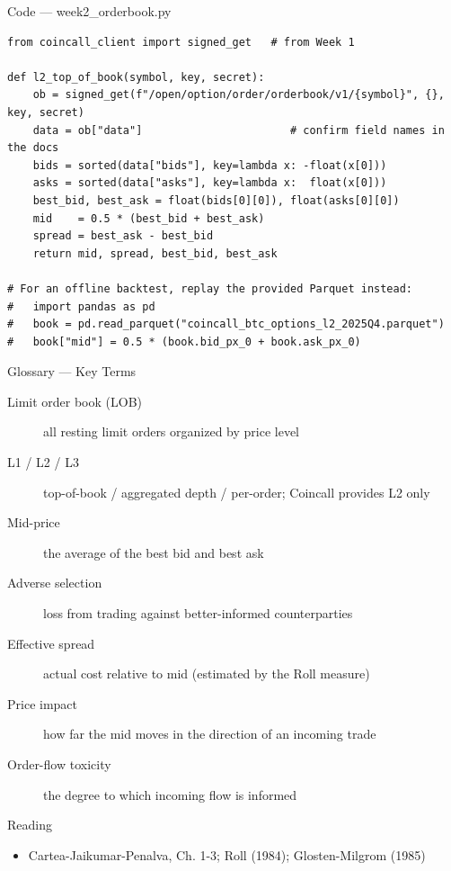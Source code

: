 \documentclass[aspectratio=169,10pt]{beamer}
\begin{document}
\begin{frame}[fragile]{Code --- week2\_orderbook.py}
\begin{lstlisting}
from coincall_client import signed_get   # from Week 1

def l2_top_of_book(symbol, key, secret):
    ob = signed_get(f"/open/option/order/orderbook/v1/{symbol}", {}, key, secret)
    data = ob["data"]                       # confirm field names in the docs
    bids = sorted(data["bids"], key=lambda x: -float(x[0]))
    asks = sorted(data["asks"], key=lambda x:  float(x[0]))
    best_bid, best_ask = float(bids[0][0]), float(asks[0][0])
    mid    = 0.5 * (best_bid + best_ask)
    spread = best_ask - best_bid
    return mid, spread, best_bid, best_ask

# For an offline backtest, replay the provided Parquet instead:
#   import pandas as pd
#   book = pd.read_parquet("coincall_btc_options_l2_2025Q4.parquet")
#   book["mid"] = 0.5 * (book.bid_px_0 + book.ask_px_0)
\end{lstlisting}
\end{frame}
\begin{frame}{Glossary --- Key Terms}
\footnotesize\begin{description}
\item[\color{ncsured}Limit order book (LOB)] all resting limit orders organized by price level
\item[\color{ncsured}L1 / L2 / L3] top-of-book / aggregated depth / per-order; Coincall provides L2 only
\item[\color{ncsured}Mid-price] the average of the best bid and best ask
\item[\color{ncsured}Adverse selection] loss from trading against better-informed counterparties
\item[\color{ncsured}Effective spread] actual cost relative to mid (estimated by the Roll measure)
\item[\color{ncsured}Price impact] how far the mid moves in the direction of an incoming trade
\item[\color{ncsured}Order-flow toxicity] the degree to which incoming flow is informed
\end{description}
\end{frame}

\begin{frame}{Reading}
\begin{itemize}
  \item Cartea-Jaikumar-Penalva, Ch. 1-3; Roll (1984); Glosten-Milgrom (1985)
\end{itemize}
\end{frame}
\end{document}
